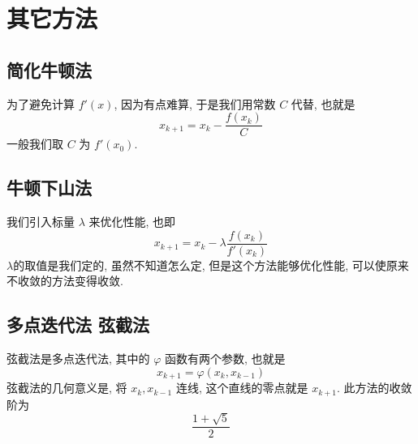 \section{其它方法}
\subsection{简化牛顿法}
\begin{frame}
为了避免计算 \( f'(x)\), 因为有点难算, 于是我们用常数 \(C\) 代替, 也就是
\[
x _{k+1} = x_{k} - \frac{f(x_{k})}{C}
\]
一般我们取 \(C\) 为 \(f ' (x _{0})\).

\end{frame}
\subsection{牛顿下山法}
\begin{frame}
我们引入标量 \( \lambda\) 来优化性能, 也即
\[
x _{k+1} = x _{k} - \lambda \frac{f(x_{k})}{f'(x_{k})}
\]
\(\lambda\)的取值是我们定的, 虽然不知道怎么定, 但是这个方法能够优化性能, 可以使原来不收敛的方法变得收敛.
\end{frame}
\subsection{多点迭代法 弦截法}

\begin{frame}
弦截法是多点迭代法, 其中的 \( \varphi\) 函数有两个参数, 也就是
\[
x_{k+1} = \varphi(x_{k}, x_{k-1})
\]
弦截法的几何意义是, 将 \( x _{k}, x _{k-1}\) 连线, 这个直线的零点就是 \(x _{k+1}\). 此方法的收敛阶为
\[
\frac{1 + \sqrt 5}{2}
\]
\end{frame}
